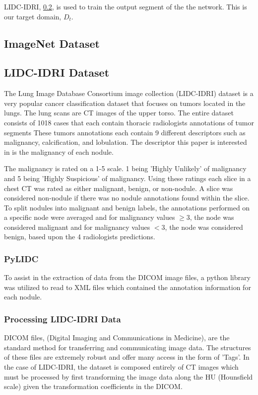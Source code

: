 \documentclass[10pt,twocolumn,letterpaper]{article}
\begin{document}
   LIDC-IDRI, \ref{sec:data-lidc}, is used to train the output segment of the
   the network. This is our target domain, $D_t$.

   \subsection{ImageNet Dataset} \label{sec:data-imagenet}


   \subsection{LIDC-IDRI Dataset} \label{sec:data-lidc}
      The Lung Image Database Consortium image collection (LIDC-IDRI) dataset
      is a very popular cancer classification dataset that focuses on tumors located
      in the lungs. The lung scans are CT images of the upper torso. The entire dataset
      consists of 1018 cases that each contain thoracic radiologists annotations of tumor segments
      These tumors annotations each contain 9 different descriptors such as malignancy,
      calcification, and lobulation. The descriptor this paper is interested in is the
      malignancy of each nodule.

      The malignancy is rated on a 1-5 scale. 1 being 'Highly Unlikely' of malignancy and
      5 being 'Highly Suspicious' of malignancy. Using these ratings each slice in a chest CT
      was rated as either malignant, benign, or non-nodule. A slice was considered non-nodule
      if there was no nodule annotations found within the slice. To split nodules into malignant
      and benign labels, the annotations performed on a specific node were averaged and for malignancy
      values $\ge 3$, the node was considered malignant and for malignancy values $< 3$, the node was
      considered benign, based upon the 4 radiologists predictions.

      \subsubsection{PyLIDC} \label{sec:data-lidc-pylidc}
         To assist in the extraction of data from the DICOM image files, a python library was utilized
         to read to XML files which contained the annotation information for each nodule. \cite{Hancock2018}

      \subsubsection{Processing LIDC-IDRI Data} \label{sec:data-lidc-processing}
         DICOM files, (Digital Imaging and Communications in Medicine), are the standard method for transferring
         and communicating image data. The structures of these files are extremely robust and offer many access in
         the form of 'Tags'. In the case of LIDC-IDRI, the dataset is composed entirely of CT images which must be
         processed by first transforming the image data along the HU (Hounsfield scale) given the transformation
         coefficients in the DICOM.
\end{document}

